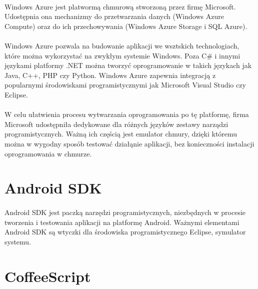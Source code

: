 \paragraph{} %
Windows Azure jest platwormą chmurową stworzoną przez firmę Microsoft. Udostępnia ona mechanizmy do przetwarzania danych (Windows Azure Compute) oraz do ich przechowywania (Windows Azure Storage  i SQL Azure).
\paragraph{} %
\label{par:}

Windows Azure pozwala na budowanie aplikacji we wsztskich technologiach, które można wykorzystać na zwykłym systemie Windows. Poza C\# i innymi językami platformy .NET można tworzyć oprogramowanie w takich językach jak Java, C++, PHP czy Python. Windows Azure zapewnia integracją z popularnymi środowiskami programistycznymi jak Microsoft Visual Studio czy Eclipse.
\paragraph{} %
\label{par:}

W celu ułatwienia procesu wytwarzania oprogramowania po tę platformę, firma Microsoft udostępniła dedykowane dla różnych języków zestawy narządzi programistycznych. Ważną ich częścią jest emulator chmury, dzięki któremu można w wygodny sposób testować działąnie aplikacji, bez konieczności instalacji oprogramowania w chmurze.

\section{Android SDK} %
\label{sec:android_sdk}

\paragraph{} %
\label{par:}

Android SDK jest paczką narzędzi programistycznych, niezbędnych w procesie tworzenia i testowania aplikacji na platformę Android. Ważnymi elementami Android SDK są wtyczki dla środowiska programistycznego Eclipse, symulator systemu.

\section{CoffeeScript} %
\label{sec:coffeescript}

